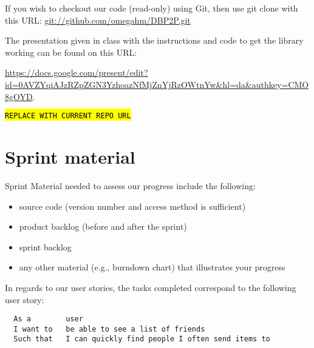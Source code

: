 \documentclass[a4paper,11pt]{article}
\begin{document}
If you wish to checkout our code (read-only) using Git, then use git clone with this URL:
\url{git://github.com/omegahm/DBP2P.git}

The presentation given in class with the instructions and code to get the library working can be found on this URL:

\noindent \url{https://docs.google.com/present/edit?id=0AVZYqiAJzRZpZGN3YzhoazNfMjZnYjRzOWtnYw&hl=da&authkey=CMO8gOYD}.

{ %
\texttt{\hl{REPLACE WITH CURRENT REPO URL}\\}
}


\section{Sprint material}
Sprint Material needed to assess our progress include the following:
\begin{itemize}
\item source code (version number and access method is sufficient)
\item product backlog (before and after the sprint)
\item sprint backlog
\item any other material (e.g., burndown chart) that illustrates your progress
\end{itemize}



In regards to our user stories, the tasks completed correspond to the following user story:
\begin{verbatim}
  As a        user
  I want to   be able to see a list of friends
  Such that   I can quickly find people I often send items to
\end{verbatim}
\end{document}
